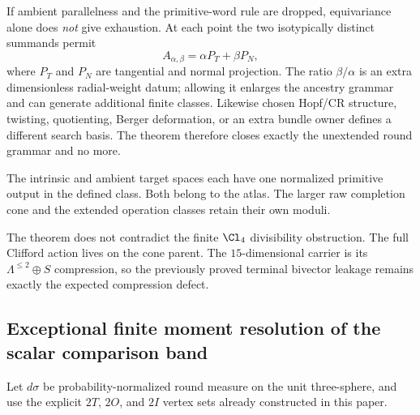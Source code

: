 \documentclass[11pt]{article}
\begin{document}
\begin{remark}
\label{p1:rem:ancestry-exhaustion-sharpness}
If ambient parallelness and the primitive-word rule are dropped, equivariance
alone does \emph{not} give exhaustion.  At each point the two isotypically
distinct summands permit
\[
 A_{\alpha,\beta}=\alpha P_T+\beta P_N,
\]
where \(P_T\) and \(P_N\) are tangential and normal projection.  The ratio
\(\beta/\alpha\) is an extra dimensionless radial-weight datum; allowing it
enlarges the ancestry grammar and can generate additional finite classes.
Likewise chosen Hopf/CR structure, twisting, quotienting, Berger deformation,
or an extra bundle owner defines a different search basis.  The theorem
therefore closes exactly the unextended round grammar and no more.
\end{remark}

\begin{remark}
The intrinsic and ambient target spaces each have one normalized primitive
output in the defined class. Both belong to the atlas. The larger raw
completion cone and the extended operation classes retain their own moduli.
\end{remark}

\begin{remark}
The theorem does not contradict the finite $\Cl_4$ divisibility obstruction.
The full Clifford action lives on the cone parent.  The $15$-dimensional
carrier is its $\Lambda^{\le2}\oplus S$ compression, so the previously proved
terminal bivector leakage remains exactly the expected compression defect.
\end{remark}



\subsection{Exceptional finite moment resolution of the scalar comparison band}
\label{p1:sec:v180-exceptional-scalar-moments}

Let $d\sigma$ be probability-normalized round measure on the unit
three-sphere, and use the explicit $2T$, $2O$, and $2I$ vertex sets already
constructed in this paper.
\end{document}
